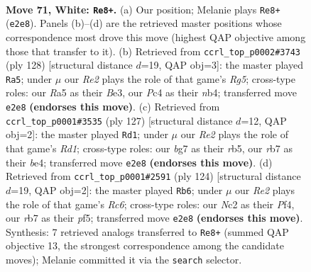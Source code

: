 \documentclass[11pt]{article}
\begin{document}
\clearpage

\begin{figure}[p]\centering
\begin{subfigure}{0.46\textwidth}\centering
\resizebox{\linewidth}{!}{%
\newchessgame
\chessboard[
  setfen={6k1/1r4b1/8/R7/2P5/8/2N1R1K1/8 w - - 62 71},
  showmover=false,
  pgfstyle=straightmove, color=movearrow, markmove={e2-e8}
]}
\caption{}
\end{subfigure}\hfill
\begin{subfigure}{0.46\textwidth}\centering
\resizebox{\linewidth}{!}{%
\newchessgame
\chessboard[
  setfen={8/2kb1r2/8/6R1/1n1N4/4B1K1/8/8 w - - 0 65},
  showmover=false,
  pgfstyle=straightmove, color=movearrow, markmove={g5-a5}
]}
\caption{}
\end{subfigure}
\\[4pt]
\begin{subfigure}{0.46\textwidth}\centering
\resizebox{\linewidth}{!}{%
\newchessgame
\chessboard[
  setfen={3r1k2/p7/n7/1R6/4B2N/4K3/8/8 b - - 0 64},
  showmover=false,
  pgfstyle=straightmove, color=movearrow, markmove={d8-d1}
]}
\caption{}
\end{subfigure}\hfill
\begin{subfigure}{0.46\textwidth}\centering
\resizebox{\linewidth}{!}{%
\newchessgame
\chessboard[
  setfen={8/4bk2/2R4K/5p2/5P2/8/8/8 w - - 18 63},
  showmover=false,
  pgfstyle=straightmove, color=movearrow, markmove={c6-b6}
]}
\caption{}
\end{subfigure}
\caption{\textbf{Move 71, White: \texttt{Re8+}.} (a) Our position; Melanie plays \texttt{Re8+} (\texttt{e2e8}). Panels (b)--(d) are the retrieved master positions whose correspondence most drove this move (highest QAP objective among those that transfer to it). (b) Retrieved from \texttt{ccrl\_top\_p0002\#3743} (ply 128) [structural distance $d$=19, QAP obj=3]: the master played \texttt{Ra5}; under $\mu$ our \emph{Re2} plays the role of that game's \emph{Rg5}; cross-type roles: our \emph{R}a5 as their \emph{B}e3, our \emph{P}c4 as their \emph{n}b4; transferred move \texttt{e2e8} \textbf{(endorses this move)}. (c) Retrieved from \texttt{ccrl\_top\_p0001\#3535} (ply 127) [structural distance $d$=12, QAP obj=2]: the master played \texttt{Rd1}; under $\mu$ our \emph{Re2} plays the role of that game's \emph{Rd1}; cross-type roles: our \emph{b}g7 as their \emph{r}b5, our \emph{r}b7 as their \emph{b}e4; transferred move \texttt{e2e8} \textbf{(endorses this move)}. (d) Retrieved from \texttt{ccrl\_top\_p0001\#2591} (ply 124) [structural distance $d$=19, QAP obj=2]: the master played \texttt{Rb6}; under $\mu$ our \emph{Re2} plays the role of that game's \emph{Rc6}; cross-type roles: our \emph{N}c2 as their \emph{P}f4, our \emph{r}b7 as their \emph{p}f5; transferred move \texttt{e2e8} \textbf{(endorses this move)}. Synthesis: 7 retrieved analogs transferred to \texttt{Re8+} (summed QAP objective 13, the strongest correspondence among the candidate moves); Melanie committed it via the \texttt{search} selector.}
\label{fig:thought-m140}
\end{figure}
\end{document}
